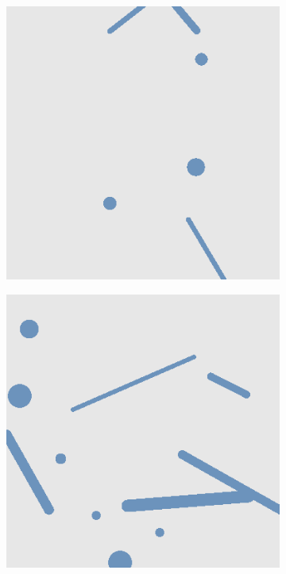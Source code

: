\def\w{0.31\textwidth}
\begin{figure}[H]
    \begin{subfigure}{\w}
        \includegraphics[width=\linewidth]{figures/generated-worlds/world_0.png}
    \end{subfigure}
    \hspace*{\fill}
    \begin{subfigure}{\w}
        \includegraphics[width=\linewidth]{figures/generated-worlds/world_1.png}

\end{subfigure}
\end{figure}
